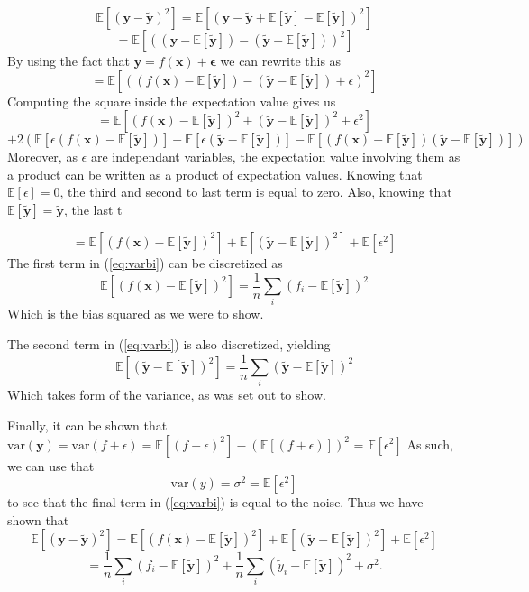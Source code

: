 \documentclass[11pt, a4paper]{article}
\begin{document}
\[
  \mathbb{E}\left[(\bm{y}-\bm{\tilde{y}})^2\right] 
  = \mathbb{E}\left[(\bm{y}-\bm{\tilde{y}} + \mathbb{E}\left[\bm{\tilde{y}}\right] - \mathbb{E}\left[\bm{\tilde{y}}\right])^2\right] 
\]
\[
  = \mathbb{E}\left[((\bm{y} - \mathbb{E}\left[\bm{\tilde{y}}\right]) - (\bm{\tilde{y}} - \mathbb{E}\left[\bm{\tilde{y}}\right]))^2\right]
\]
By using the fact that $\bm{y} = f(\bm{x}) + \bm{\epsilon}$
we can rewrite this as
\[
  = \mathbb{E}\left[((f(\bm{x}) - \mathbb{E}\left[\bm{\tilde{y}}\right]) - (\bm{\tilde{y}} - \mathbb{E}\left[\bm{\tilde{y}}\right]) + \epsilon)^2\right]
\]
Computing the square inside the expectation value gives us
\[
  = \mathbb{E}\left[(f(\bm{x}) - \mathbb{E}\left[\bm{\tilde{y}}\right])^2 + (\bm{\tilde{y}} - \mathbb{E}\left[\bm{\tilde{y}}\right])^2 + \epsilon^2 \right]\]
  \[+ 2\left(\mathbb{E}\left[\epsilon(f(\bm{x}) - \mathbb{E}\left[\bm{\tilde{y}}\right])\right]- \mathbb{E}\left[\epsilon(\bm{\tilde{y}} - \mathbb{E}\left[\bm{\tilde{y}}\right])\right] - \mathbb{E}\left[(f(\bm{x}) - \mathbb{E}\left[\bm{\tilde{y}}\right])(\bm{\tilde{y}} - \mathbb{E}\left[\bm{\tilde{y}}\right])\right]\right)
\]
Moreover, as $\epsilon$ are independant variables, the expectation value involving them as a product can be written as a product of expectation values. Knowing that $\mathbb{E}\left[\epsilon\right] = 0$, the third and second to last term is equal to zero. Also, knowing that $\mathbb{E}\left[\bm{\tilde{y}}\right] = \bm{\tilde{y}}$, the last t

\begin{equation}\label{eq:varbi}
  = \mathbb{E}\left[(f(\bm{x}) - \mathbb{E}\left[\bm{\tilde{y}}\right])^2\right] + \mathbb{E}\left[(\bm{\tilde{y}} - \mathbb{E}\left[\bm{\tilde{y}}\right])^2\right] + \mathbb{E}\left[\epsilon^2 \right]
\end{equation}
The first term in (\ref{eq:varbi}) can be discretized as
\[
  \mathbb{E}\left[(f(\bm{x}) - \mathbb{E}\left[\bm{\tilde{y}}\right])^2\right] = \frac{1}{n}\sum_i(f_i - \mathbb{E}\left[\bm{\tilde{y}}\right])^2
\]
Which is the bias squared as we were to show.

The second term in (\ref{eq:varbi}) is also discretized, yielding
\[
  \mathbb{E}\left[(\bm{\tilde{y}} - \mathbb{E}\left[\bm{\tilde{y}}\right])^2\right] = \frac{1}{n}\sum_i(\bm{\tilde{y}} - \mathbb{E}\left[\bm{\tilde{y}}\right])^2
\]
Which takes form of the variance, as was set out to show.

Finally, it can be shown that $\text{var}(\bm{y}) = \text{var}(f + \epsilon) = \mathbb{E}\left[(f + \epsilon)^2\right] - (\mathbb{E}\left[(f + \epsilon)\right])^2$ = $\mathbb{E}\left[\epsilon^2\right]$ As such, we can use that \[
  \text{var}(y) = \sigma^2 = \mathbb{E}\left[\epsilon^2\right]
\]
to see that the final term in (\ref{eq:varbi}) is equal to the noise. Thus we have shown that 
\[
\mathbb{E}\left[(\bm{y}-\bm{\tilde{y}})^2\right] = \mathbb{E}\left[(f(\bm{x}) - \mathbb{E}\left[\bm{\tilde{y}}\right])^2\right] + \mathbb{E}\left[(\bm{\tilde{y}} - \mathbb{E}\left[\bm{\tilde{y}}\right])^2\right] + \mathbb{E}\left[\epsilon^2 \right]
\]
\[
=\frac{1}{n}\sum_i(f_i-\mathbb{E}\left[\bm{\tilde{y}}\right])^2+\frac{1}{n}\sum_i(\tilde{y}_i-\mathbb{E}\left[\bm{\tilde{y}}\right])^2+\sigma^2.
\]
\end{document}
